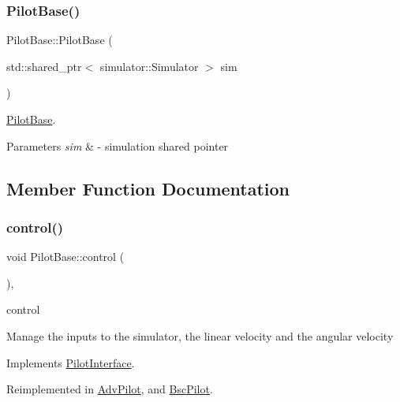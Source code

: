 \subsubsection{\texorpdfstring{Pilot\+Base()}{PilotBase()}}
{\footnotesize\ttfamily Pilot\+Base\+::\+Pilot\+Base (\begin{DoxyParamCaption}\item[{std\+::shared\+\_\+ptr$<$ simulator\+::\+Simulator $>$}]{sim }\end{DoxyParamCaption})}



\hyperlink{classPilotBase}{Pilot\+Base}. 


\begin{DoxyParams}{Parameters}
{\em sim} & -\/ simulation shared pointer \\
\hline
\end{DoxyParams}


\subsection{Member Function Documentation}
\mbox{\label{classPilotBase_a611edd0c1a501e1bb6722f5b62e95d6b}} 
\subsubsection{\texorpdfstring{control()}{control()}}
{\footnotesize\ttfamily void Pilot\+Base\+::control (\begin{DoxyParamCaption}{ }\end{DoxyParamCaption})\hspace{0.3cm}{\ttfamily [protected]}, {\ttfamily [virtual]}}



control 

Manage the inputs to the simulator, the linear velocity and the angular velocity 

Implements \hyperlink{classPilotInterface_a8847bf56785f024f6168e7c57bbb78dc}{Pilot\+Interface}.



Reimplemented in \hyperlink{classAdvPilot_a5da70d6e9d93bf585a84af786d067739}{Adv\+Pilot}, and \hyperlink{classBscPilot_a42240aa898a2719f14d816bbe08a0f3f}{Bsc\+Pilot}.

\mbox{\label{classPilotBase_ad4a3db2cf9d40b5936dba864977eee95}} 
